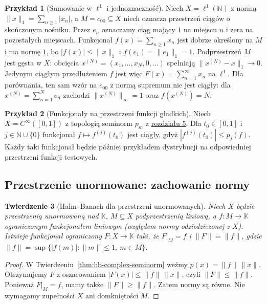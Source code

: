 \documentclass[11pt,a4paper]{article}
\numberwithin{equation}{section}
\theoremstyle{plain}
\newtheorem{twierdzenie}{Twierdzenie}[section]
\theoremstyle{definition}
\newtheorem{przyklad}[twierdzenie]{Przykład}
\theoremstyle{remark}
\newcommand{\N}{\mathbb N}
\newcommand{\K}{\mathbb K}
\begin{document}
\begin{przyklad}[Sumowanie w $\ell^1$ i jednoznaczność]
Niech $X=\ell^1(\N)$ z normą
$\|x\|_1=\sum_{n\ge1}|x_n|$, a $M=c_{00}\subseteq X$
niech oznacza przestrzeń ciągów o skończonym nośniku.
Przez $e_n$ oznaczamy ciąg mający $1$ na miejscu $n$
i zera na pozostałych miejscach. Funkcjonał $f(x)=\sum_{n\ge1}x_n$ jest dobrze określony
na $M$ i ma normę $1$, bo $|f(x)|\le\|x\|_1$
i $f(e_1)=\|e_1\|_1=1$. Podprzestrzeń $M$ jest gęsta
w $X$: obcięcia $x^{(N)}=(x_1,\ldots,x_N,0,\ldots)$
spełniają $\|x^{(N)}-x\|_1\to0$. Jedynym ciągłym
przedłużeniem $f$ jest więc
$F(x)=\sum_{n=1}^\infty x_n$ na $\ell^1$.
Dla porównania, ten sam wzór na $c_{00}$ z normą
supremum nie jest ciągły: dla
$x^{(N)}=\sum_{n=1}^N e_n$ zachodzi
$\|x^{(N)}\|_\infty=1$ oraz $f(x^{(N)})=N$.
\end{przyklad}

\begin{przyklad}[Funkcjonały na przestrzeni funkcji gładkich]
Niech $X=C^\infty([0,1])$ z topologią seminorm
$p_m$ z \hyperref[sec:lokalnie-wypukle]{rozdziału 5}. Dla $t_0\in[0,1]$ i
$j\in\N\cup\{0\}$ funkcjonał
$f\mapsto f^{(j)}(t_0)$ jest ciągły, gdyż
$|f^{(j)}(t_0)|\le p_j(f)$. Każdy taki funkcjonał
będzie później przykładem dystrybucji na odpowiedniej
przestrzeni funkcji testowych.
\end{przyklad}

\subsection{Przestrzenie unormowane: zachowanie normy}

\begin{twierdzenie}[Hahn--Banach dla przestrzeni unormowanych]
\label{thm:hb-normed}
Niech $X$ będzie przestrzenią unormowaną nad $\K$,
$M\subseteq X$ podprzestrzenią liniową, a
$f:M\to\K$ ograniczonym funkcjonałem liniowym
(względem normy odziedziczonej z $X$).
Istnieje funkcjonał ograniczony $F:X\to\K$ taki, że
$F|_M=f$ i $\|F\|=\|f\|$, gdzie
$\|f\|=\sup\{|f(m)|:\|m\|\le1,\ m\in M\}$.
\end{twierdzenie}
\begin{proof}
W Twierdzeniu~\ref{thm:hb-complex-seminorm}
weźmy $p(x)=\|f\|\,\|x\|$. Otrzymujemy $F$
z oszacowaniem $|F(x)|\le\|f\|\,\|x\|$,
czyli $\|F\|\le\|f\|$. Ponieważ $F|_M=f$,
mamy także $\|F\|\ge\|f\|$. Zatem normy są równe.
Nie wymagamy zupełności $X$ ani domkniętości $M$.
\end{proof}
\end{document}
